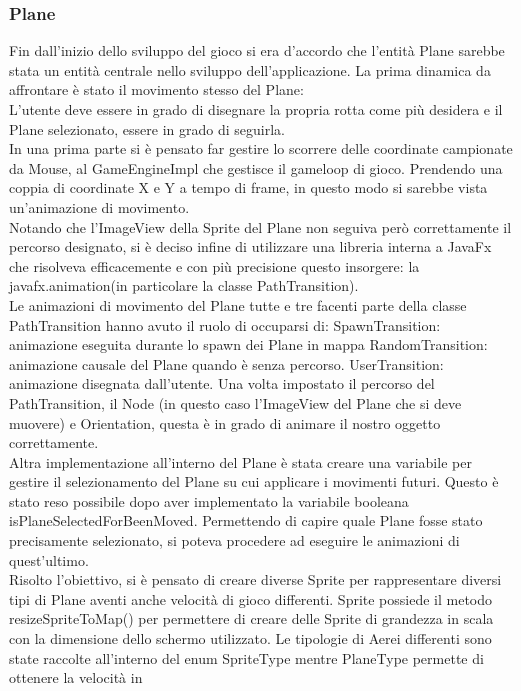 \documentclass[a4paper,12pt]{report}
\begin{document}
\subsubsection{Plane}
Fin dall’inizio dello sviluppo del gioco si era d’accordo che l’entità Plane sarebbe stata un entità centrale nello sviluppo dell’applicazione.
La prima dinamica da affrontare è stato il movimento stesso del Plane:
\\
L’utente deve essere in grado di disegnare la propria rotta come più desidera e il Plane selezionato, essere in grado di seguirla.
\\
In una prima parte si è pensato far gestire lo scorrere delle coordinate campionate da Mouse, al GameEngineImpl che gestisce il gameloop
di gioco.
Prendendo una coppia di coordinate X e Y a tempo di frame, in questo modo si sarebbe vista un’animazione di movimento.
\\
Notando che l’ImageView della Sprite del Plane non seguiva però correttamente il percorso designato, si è deciso infine di utilizzare una 
libreria interna a JavaFx che risolveva efficacemente e con più precisione questo insorgere: la javafx.animation(in particolare la classe 
PathTransition).
\\
Le animazioni di movimento del Plane tutte e tre facenti parte della classe PathTransition hanno avuto il ruolo di occuparsi di:
	SpawnTransition: animazione eseguita durante lo spawn dei Plane in mappa
	RandomTransition: animazione causale del Plane quando è senza percorso.
	UserTransition: animazione disegnata dall’utente.
Una volta impostato il percorso del PathTransition, il Node (in questo caso l’ImageView del Plane che si deve muovere) e Orientation, questa 
è in grado di animare il nostro oggetto correttamente.
\\
Altra implementazione all’interno del Plane è stata creare una variabile per gestire il selezionamento del Plane su cui applicare i movimenti 
futuri.
Questo è stato reso possibile dopo aver implementato la variabile booleana isPlaneSelectedForBeenMoved.
Permettendo di capire quale Plane fosse stato precisamente selezionato, si poteva procedere ad eseguire le animazioni di quest’ultimo.
\\
Risolto l’obiettivo, si è pensato di creare diverse Sprite per rappresentare diversi tipi di Plane aventi anche velocità di gioco differenti.
Sprite possiede il metodo resizeSpriteToMap() per permettere di creare delle Sprite di grandezza in scala con la dimensione dello schermo 
utilizzato.
Le tipologie di Aerei differenti sono state raccolte all’interno del enum SpriteType mentre PlaneType permette di ottenere la velocità in 
\end{document}
